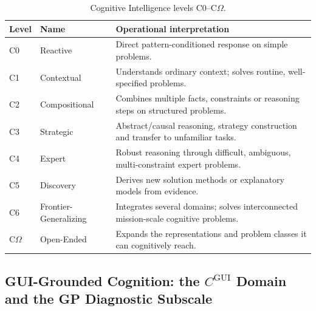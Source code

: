 \documentclass[11pt]{article}
\theoremstyle{definition}
\newcommand{\Om}{\ensuremath{\Omega}}
\begin{document}
\begin{table}[!htbp]
\centering\small
\begin{tabularx}{\textwidth}{@{}llY@{}}
\toprule
Level & Name & Operational interpretation \\
\midrule
C0 & Reactive & Direct pattern-conditioned response on simple problems. \\
C1 & Contextual & Understands ordinary context; solves routine, well-specified problems. \\
C2 & Compositional & Combines multiple facts, constraints or reasoning steps on structured problems. \\
C3 & Strategic & Abstract/causal reasoning, strategy construction and transfer to unfamiliar tasks. \\
C4 & Expert & Robust reasoning through difficult, ambiguous, multi-constraint expert problems. \\
C5 & Discovery & Derives new solution methods or explanatory models from evidence. \\
C6 & Frontier-Generalizing & Integrates several domains; solves interconnected mission-scale cognitive problems. \\
C\Om{} & Open-Ended & Expands the representations and problem classes it can cognitively reach. \\
\bottomrule
\end{tabularx}
\caption{Cognitive Intelligence levels C0--C\Om{}.}
\label{tab:clevels}
\end{table}

\subsection{GUI-Grounded Cognition: the \texorpdfstring{$C^{\mathrm{GUI}}$}{C-GUI} Domain and the GP Diagnostic Subscale}\label{sec:gp}
\end{document}
